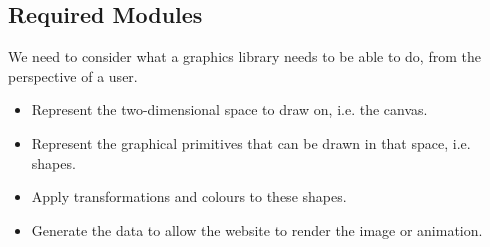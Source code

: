 \documentclass[../main.tex]{subfiles}
\begin{document}
        \subsection{Required Modules}
            We need to consider what a graphics library needs to be able to do, from the
                perspective of a user.
            \begin{itemize}
                \item Represent the two-dimensional space to draw on, i.e. the canvas.
                \item Represent the graphical primitives that can be drawn in that space, i.e.
                      shapes.
                \item Apply transformations and colours to these shapes.
                \item Generate the data to allow the website to render the image or animation.
            \end{itemize}
\end{document}
